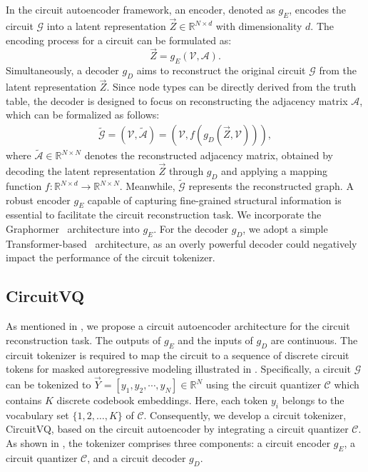 In the circuit autoencoder framework, an encoder, denoted as $g_E$, encodes the circuit $\mathcal{G}$ into a latent representation $\vec{Z} \in \mathbb{R}^{N \times d}$ with dimensionality $d$.
The encoding process for a circuit can be formulated as:
\begin{equation}
    \vec{Z} = g_{E}(\mathcal{V}, \mathcal{A}).
    \label{eq:encoder}
\end{equation}
Simultaneously, a decoder $g_D$ aims to reconstruct the original circuit $\mathcal{G}$ from the latent representation $\vec{Z}$. 
Since node types can be directly derived from the truth table, the decoder is designed to focus on reconstructing the adjacency matrix $\mathcal{A}$, which can be formalized as follows:
\begin{align}
	\tilde{\mathcal{G}} = (\mathcal{V}, \tilde{\mathcal{A}}) = (\mathcal{V}, f(g_{D}(\vec{Z}, \mathcal{V}))),
	\label{eq:decoder}
\end{align}
where $\tilde{\mathcal{A}} \in \mathbb{R}^{N \times N}$ denotes the reconstructed adjacency matrix, obtained by decoding the latent representation $\vec{Z}$ through $g_D$ and applying a mapping function $f: \mathbb{R}^{N \times d} \rightarrow \mathbb{R}^{N \times N}$. 
Meanwhile, $\tilde{\mathcal{G}}$ represents the reconstructed graph.
A robust encoder $g_E$ capable of capturing fine-grained structural information is essential to facilitate the circuit reconstruction task. 
We incorporate the Graphormer~\cite{ying2021graphormer} architecture into $g_E$. 
For the decoder $g_D$, we adopt a simple Transformer-based~\cite{dubey2024llama3} architecture, as an overly powerful decoder could negatively impact the performance of the circuit tokenizer.

\subsection{CircuitVQ}
\label{sec:circuitvq}
As mentioned in , we propose a circuit autoencoder architecture for the circuit reconstruction task.
The outputs of $g_E$ and the inputs of $g_D$ are continuous.
The circuit tokenizer is required to map the circuit to a sequence of discrete circuit tokens for masked autoregressive modeling illustrated in .
Specifically, a circuit $\mathcal{G}$ can be tokenized to $\vec{Y} = [y_1, y_2, \cdots, y_{N}] \in \mathbb{R}^{N}$ using the circuit quantizer $\mathcal{C}$ which contains $K$ discrete codebook embeddings.
Here, each token $y_i$ belongs to the vocabulary set $\{1, 2, \dots, K\}$ of $\mathcal{C}$.
Consequently, we develop a circuit tokenizer, CircuitVQ, based on the circuit autoencoder by integrating a circuit quantizer $\mathcal{C}$.
As shown in , the tokenizer comprises three components: a circuit encoder $g_E$, a circuit quantizer $\mathcal{C}$, and a circuit decoder $g_D$. 

